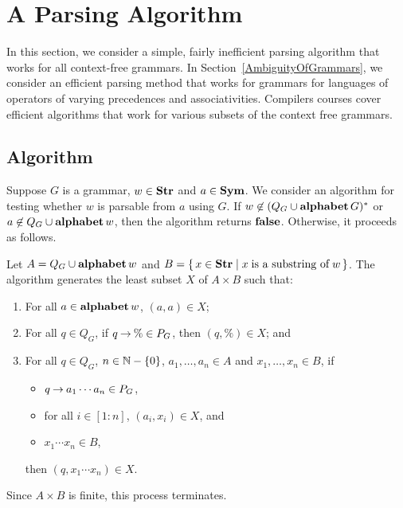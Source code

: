 \section{A Parsing Algorithm}
\label{AParsingAlgorithm}

%
In this section, we consider a simple, fairly inefficient parsing
algorithm that works for all context-free grammars.  In
Section~\ref{AmbiguityOfGrammars}, we consider an efficient parsing
method that works for grammars for languages of operators of varying
precedences and associativities.  Compilers courses cover efficient
algorithms that work for various subsets of the context free grammars.

\subsection{Algorithm}

Suppose $G$ is a grammar, $w\in\mathbf{Str}$ and $a\in\mathbf{Sym}$.  We consider an
algorithm for testing whether $w$ is parsable from $a$ using $G$.
If $w\not\in(Q_G\cup\mathbf{alphabet}\,G)^*$ or $a\not\in Q_G\cup\mathbf{alphabet}\,w$,
then the algorithm returns $\mathbf{false}$.
Otherwise, it proceeds as follows.

Let $A=Q_G\cup\mathbf{alphabet}\,w$ and $B=\{ \, x\in\mathbf{Str} \mid x\;\allowbreak\mbox{is a substring
of}\allowbreak\;w \, \}$.
The algorithm generates the least subset $X$ of $A\times B$ such that:
\begin{enumerate}[\quad(1)]
\item For all $a\in\mathbf{alphabet}\,w$, $(a,a)\in X$;

\item For all $q\in Q_G$, if $q\mathbin{\to}\%\in P_G$, then
  $(q,\%)\in X$; and

\item For all $q\in Q_G$, $n\in\mathbb{N}-\{0\}$, $a_1,\ldots,a_n\in A$ and
  $x_1,\ldots,x_n\in B$, if
  \begin{itemize}
  \item $q\mathbin{\to} a_1\cdots a_n\in P_G$,

  \item for all $i\in[1:n]$, $(a_i,x_i)\in X$, and

  \item $x_1\cdots x_n\in B$,
  \end{itemize}
then $(q,x_1\cdots x_n)\in X$.
\end{enumerate}
Since $A\times B$ is finite, this process terminates.


